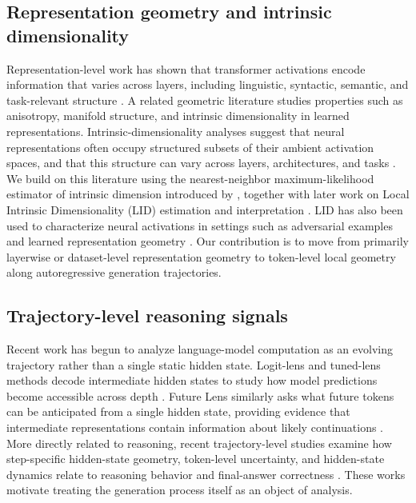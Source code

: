 \documentclass{article}
\theoremstyle{plain}
\theoremstyle{definition}
\theoremstyle{remark}
\begin{document}
\subsection{Representation geometry and intrinsic dimensionality}
Representation-level work has shown that transformer activations encode information that varies across layers, including linguistic, syntactic, semantic, and task-relevant structure \citep{van_Aken_2019,ethayarajh2019contextual,tenney2019bert,hewitt2019structural,clark2019bert}. A related geometric literature studies properties such as anisotropy, manifold structure, and intrinsic dimensionality in learned representations. Intrinsic-dimensionality analyses suggest that neural representations often occupy structured subsets of their ambient activation spaces, and that this structure can vary across layers, architectures, and tasks \citep{valeriani2023geometryhiddenrepresentationslarge,ansui2019intrinsic,facco2017estimating}. We build on this literature using the nearest-neighbor maximum-likelihood estimator of intrinsic dimension introduced by \citet{NIPS2004_74934548}, together with later work on Local Intrinsic Dimensionality (LID) estimation and interpretation \citep{amsaleg2015estimating,houle2017local}. LID has also been used to characterize neural activations in settings such as adversarial examples and learned representation geometry \citep{ma2018characterizing,ansui2019intrinsic}. Our contribution is to move from primarily layerwise or dataset-level representation geometry to token-level local geometry along autoregressive generation trajectories.

\subsection{Trajectory-level reasoning signals}
Recent work has begun to analyze language-model computation as an evolving trajectory rather than a single static hidden state. Logit-lens and tuned-lens methods decode intermediate hidden states to study how model predictions become accessible across depth \citep{belrose2023eliciting}. Future Lens similarly asks what future tokens can be anticipated from a single hidden state, providing evidence that intermediate representations contain information about likely continuations \citep{pal2023future}. More directly related to reasoning, recent trajectory-level studies examine how step-specific hidden-state geometry, token-level uncertainty, and hidden-state dynamics relate to reasoning behavior and final-answer correctness \citep{sun2026llm,zur2025road}. These works motivate treating the generation process itself as an object of analysis.
\end{document}
